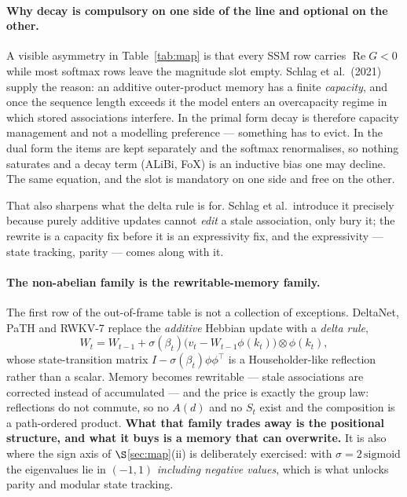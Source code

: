 \documentclass[11pt]{article}
\begin{document}
\paragraph{Why decay is compulsory on one side of the line and optional on the
other.} A visible asymmetry in Table~\ref{tab:map} is that every SSM row carries
$\operatorname{Re}G < 0$ while most softmax rows leave the magnitude slot empty.
Schlag et al.\ (2021) supply the reason: an additive outer-product memory has a
finite \emph{capacity}, and once the sequence length exceeds it the model enters an
overcapacity regime in which stored associations interfere. In the primal form decay
is therefore capacity management and not a modelling preference --- something has to
evict. In the dual form the items are kept separately and the softmax renormalises,
so nothing saturates and a decay term (ALiBi, FoX) is an inductive bias one may
decline. The same equation, and the slot is mandatory on one side and free on the
other.

That also sharpens what the delta rule is for. Schlag et al.\ introduce it precisely
because purely additive updates cannot \emph{edit} a stale association, only bury it;
the rewrite is a capacity fix before it is an expressivity fix, and the expressivity
--- state tracking, parity --- comes along with it.

\paragraph{The non-abelian family is the rewritable-memory family.} The first row of
the out-of-frame table is not a collection of exceptions. DeltaNet, PaTH and RWKV-7
replace the \emph{additive} Hebbian update with a \emph{delta rule},
\[
  W_t = W_{t-1} + \sigma(\beta_t)\big(v_t - W_{t-1}\phi(k_t)\big)\otimes\phi(k_t),
\]
whose state-transition matrix $I - \sigma(\beta_t)\phi\phi^{\!\top}$ is a
Householder-like reflection rather than a scalar. Memory becomes rewritable ---
stale associations are corrected instead of accumulated --- and the price is exactly
the group law: reflections do not commute, so no $A(d)$ and no $S_t$ exist and the
composition is a path-ordered product. \textbf{What that family trades away is the
positional structure, and what it buys is a memory that can overwrite.} It is also
where the sign axis of $\S$\ref{sec:map}(ii) is deliberately exercised: with
$\sigma = 2\,\mathrm{sigmoid}$ the eigenvalues lie in $(-1,1)$ \emph{including
negative values}, which is what unlocks parity and modular state tracking.
\end{document}
